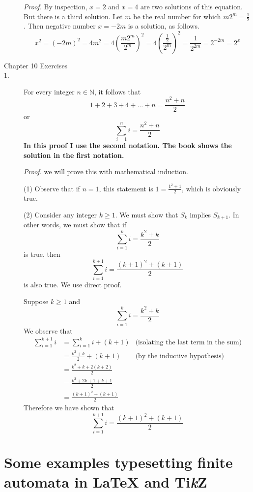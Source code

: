 \documentclass{article}
\newcommand{\TikZ}{Ti\textit{k}Z\xspace}
\begin{document}
\begin{description}
  {\em Proof.}  By inspection, $x=2$ and $x=4$ are two solutions of
  this equation.  But there is a third solution.  Let $m$ be the real
  number for which $m2^m = \frac{1}{2}$.  Then negative number $x=-2m$
  is a solution, as follows.
  \[
  x^2 = (-2m)^2
      = 4m^2
      = 4\left( \frac{m2^m}{2^m} \right)^2
      = 4\left(\frac{\frac{1}{2}}{2^m}\right)^2
      = \frac{1}{2^{2m}}
      = 2^{-2m}
      = 2^x
      \]

\item[Chapter 10 Exercises]

\item[1.] For every integer $n\in\mathbb{N}$, it follows that
  \[
  1 + 2 + 3 + 4 + \ldots + n  = \frac{n^2 + n}{2}
  \]
  or
  \[
  \sum_{i=1}^{n} i  = \frac{n^2 + n}{2}
  \]
  {\bf In this proof I use the second notation.  The book shows the
  solution in the first notation.}

  {\em Proof.}  we will prove this with mathematical induction.

  (1) Observe that if $n=1$, this statement is $1=\frac{1^2 + 1}{2}$,
  which is obviously true.

  (2) Consider any integer $k \geq 1$.  We must show that $S_k$
  implies $S_{k+1}$.  In other words, we must show that if
  \[
  \sum_{i=1}^{k} i = \frac{k^2+k}{2}
  \]
  is true, then
  \[
  \sum_{i=1}^{k+1} i = \frac{(k+1)^2+(k+1)}{2}
  \]
  is also true.  We use direct proof.

  Suppose $k\geq 1$ and 
  \[
  \sum_{i=1}^{k} i = \frac{k^2+k}{2}
  \]
  We observe that
  \begin{align*}
    \sum_{i=1}^{k+1} i
    &= \sum_{i=1}^{k} i + (k+1) &\text{(isolating the last term in the sum)} \\
    &= \frac{k^2+k}{2} + (k+1) & \text{(by the inductive hypothesis)}\\
    &= \frac{k^2 + k + 2(k+2)}{2} \\
    &= \frac{k^2 + 2k + 1 + k + 1}{2}\\
    &= \frac{(k+1)^2 + (k+1)}{2}
  \end{align*}
  Therefore we have shown that 
  \[
  \sum_{i=1}^{k+1} i = \frac{(k+1)^2+(k+1)}{2}
  \]

\end{description}



\section{Some examples typesetting finite automata in \LaTeX{} and \TikZ}
\end{document}
